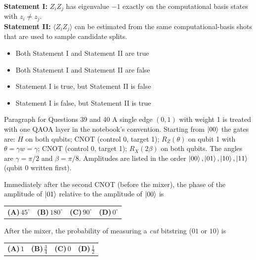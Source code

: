 \documentclass[11pt,a4paper]{article}
\newcommand{\optlabel}[1]{\textbf{(#1)}}
\newenvironment{qitem}[1]{\begin{list}{}{\setlength{\leftmargin}{3.3em}\setlength{\labelwidth}{3.1em}%
  \setlength{\labelsep}{0.2em}\setlength{\topsep}{3pt}\setlength{\parsep}{3pt}}\item[\textbf{Q.#1}\hfill]}{\end{list}}
\newcommand{\qsep}{\par\vspace{2pt}{\color{black!15}\hrule}\vspace{4pt}}
\begin{document}
\begin{qitem}{38}
\textbf{Statement I:} $Z_iZ_j$ has eigenvalue $-1$ exactly on the computational basis states with $z_i \neq z_j$.\\[1mm]
\textbf{Statement II:} $\langle Z_iZ_j\rangle$ can be estimated from the same computational-basis shots that are used to sample
candidate splits.
\begin{itemize}[leftmargin=2.6em, labelsep=0.4em, itemsep=2pt, topsep=3pt]
\item[\optlabel{A}] Both Statement I and Statement II are true
\item[\optlabel{B}] Both Statement I and Statement II are false
\item[\optlabel{C}] Statement I is true, but Statement II is false
\item[\optlabel{D}] Statement I is false, but Statement II is true
\end{itemize}
\end{qitem}
\qsep

\begin{passagebox}{Paragraph for Questions 39 and 40}
A single edge $(0,1)$ with weight 1 is treated with one QAOA layer in the notebook's convention. Starting from
$\ket{00}$ the gates are: $H$ on both qubits; CNOT (control 0, target 1); $R_Z(\theta)$ on qubit 1 with $\theta = \gamma w = \gamma$;
CNOT (control 0, target 1); $R_X(2\beta)$ on both qubits. The angles are $\gamma = \pi/2$ and $\beta = \pi/8$.
Amplitudes are listed in the order $\ket{00}, \ket{01}, \ket{10}, \ket{11}$ (qubit 0 written first).
\end{passagebox}
\begin{qitem}{39}
Immediately after the second CNOT (before the mixer), the phase of the amplitude of $\ket{01}$ relative to the amplitude
of $\ket{00}$ is
\par\smallskip\noindent\begin{tabularx}{\linewidth}{@{}*{4}{L}@{}}
\optlabel{A}\,$45^\circ$ & \optlabel{B}\,$180^\circ$ & \optlabel{C}\,$90^\circ$ & \optlabel{D}\,$0^\circ$
\end{tabularx}
\end{qitem}
\qsep

\begin{qitem}{40}
After the mixer, the probability of measuring a \emph{cut} bitstring ($01$ or $10$) is
\par\smallskip\noindent\begin{tabularx}{\linewidth}{@{}*{4}{L}@{}}
\optlabel{A}\,$1$ & \optlabel{B}\,$\tfrac34$ & \optlabel{C}\,$0$ & \optlabel{D}\,$\tfrac12$
\end{tabularx}
\end{qitem}
\qsep
\end{document}
